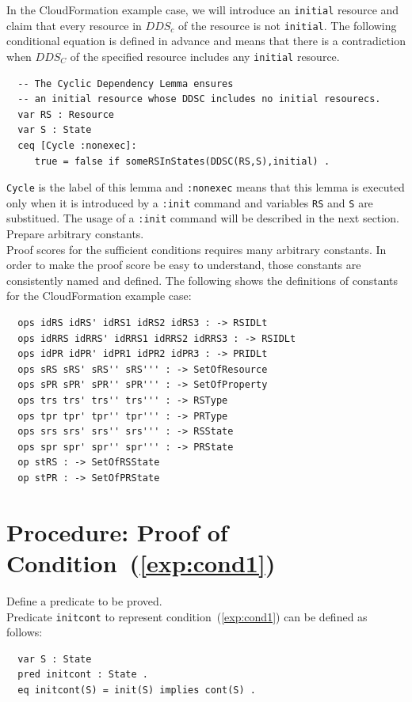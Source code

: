 \documentclass[12pt]{report}
\begin{document}
In the CloudFormation example case, we will introduce an {\tt initial}
resource and claim that every resource in $DDS_c$ of the resource is
not {\tt initial}. The following conditional equation is defined in
advance and means that there is a contradiction when $DDS_C$ of the
specified resource includes any {\tt initial} resource.
\begin{verbatim}
  -- The Cyclic Dependency Lemma ensures
  -- an initial resource whose DDSC includes no initial resourecs.
  var RS : Resource
  var S : State
  ceq [Cycle :nonexec]: 
     true = false if someRSInStates(DDSC(RS,S),initial) .
\end{verbatim}
{\tt Cycle} is the label of this lemma and {\tt :nonexec} means that
this lemma is executed only when it is introduced by a {\tt :init}
command and variables {\tt RS} and {\tt S} are substitued. The usage
of a {\tt :init} command will be described in the next section.\\

 Prepare arbitrary constants. \\
Proof scores for the sufficient conditions requires many arbitrary constants.
In order to make the proof score be easy to understand, those constants
are consistently named and defined. The following shows the definitions
of constants for the CloudFormation example case:
\begin{verbatim}
  ops idRS idRS' idRS1 idRS2 idRS3 : -> RSIDLt
  ops idRRS idRRS' idRRS1 idRRS2 idRRS3 : -> RSIDLt
  ops idPR idPR' idPR1 idPR2 idPR3 : -> PRIDLt
  ops sRS sRS' sRS'' sRS''' : -> SetOfResource
  ops sPR sPR' sPR'' sPR''' : -> SetOfProperty
  ops trs trs' trs'' trs''' : -> RSType
  ops tpr tpr' tpr'' tpr''' : -> PRType
  ops srs srs' srs'' srs''' : -> RSState
  ops spr spr' spr'' spr''' : -> PRState
  op stRS : -> SetOfRSState
  op stPR : -> SetOfPRState
\end{verbatim}
\section{Procedure: Proof of Condition~(\ref{exp:cond1})}
\label{sec:initcont}
 Define a predicate to be proved. \\
Predicate {\tt initcont} to represent condition~(\ref{exp:cond1}) can be defined as follows:
\begin{verbatim}
  var S : State
  pred initcont : State .
  eq initcont(S) = init(S) implies cont(S) .
\end{verbatim}
\end{document}
